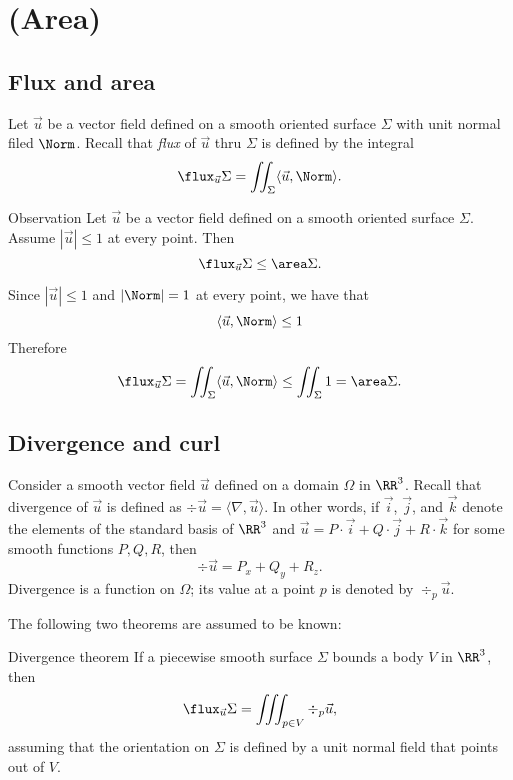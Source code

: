 \chapter{(Area)}

\section{Flux and area}

Let $\vec u$ be a vector field defined on a smooth oriented surface $\Sigma$ with unit normal filed $\Norm$.
Recall that \emph{flux} of $\vec u$ thru $\Sigma$ is defined by the integral 
\[\flux_{\vec u}\Sigma=\iint_\Sigma \langle \vec u,\Norm\rangle.\]


\begin{thm}{Observation}\label{obs:flux}
Let $\vec u$ be a vector field defined on a smooth oriented surface $\Sigma$.
Assume $|\vec u|\le 1$ at every point.
Then 
\[\flux_{\vec u}\Sigma \le \area\Sigma.\]
\end{thm}

Since $|\vec u|\le 1$ and $|\Norm|=1$ at every point,
we have that
\[\langle\vec u,\Norm\rangle\le 1\]
Therefore 
\[\flux_{\vec u}\Sigma=\iint_\Sigma \langle\vec u,\Norm\rangle\le \iint_\Sigma1=\area\Sigma.\]
\qedsf
\section{Divergence and curl}


Consider a smooth vector field $\vec u$ defined on a domain $\Omega$ in $\RR^3$.
Recall that divergence of $\vec u$ is defined as $\div\vec u=\langle \nabla,\vec u\rangle$.
In other words, if $\vec i$, $\vec j$, and $\vec k$ denote the elements of the standard basis of  $\RR^3$ and
$\vec u=P\cdot \vec i+Q\cdot\vec j+R\cdot\vec k$
for some smooth functions $P,Q,R$,
then
\[\div\vec u= P_x+Q_y+R_z.\]
Divergence is a function on $\Omega$;
its value at a point $p$ is denoted by $\div_p\vec u$.

The following two theorems are assumed to be known:

\begin{thm}{Divergence theorem}\label{thm:div}
If a piecewise smooth surface $\Sigma$ bounds a body $V$ in $\RR^3$, then
\[\flux_{\vec u}\Sigma=\iiint_{p\in V}\div_p \vec u,\]
assuming that the orientation on $\Sigma$ is defined by a unit normal field that points out of $V$.
\end{thm}


